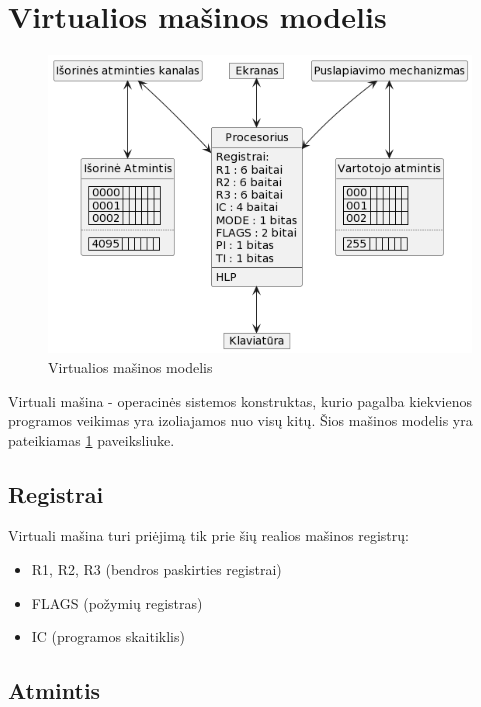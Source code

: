 \documentclass{VUMIFInfKursinis}
\begin{document}
\section{Virtualios mašinos modelis}

\begin{figure}[H]
	\centering	
	\includegraphics[scale=0.65]{img/reali_masina}
	\caption{Virtualios mašinos modelis}   %
	\label{img:virtuali_masina}
\end{figure}

Virtuali mašina - operacinės sistemos konstruktas, kurio pagalba kiekvienos programos veikimas yra izoliajamos nuo visų kitų. Šios mašinos modelis yra pateikiamas \ref{img:virtuali_masina} paveiksliuke.

\subsection{Registrai}

Virtuali mašina turi priėjimą tik prie šių realios mašinos registrų:

\begin{itemize}
	\item R1, R2, R3 (bendros paskirties registrai)
	\item FLAGS (požymių registras)
	\item IC (programos skaitiklis)
\end{itemize}

\subsection{Atmintis}
\end{document}
